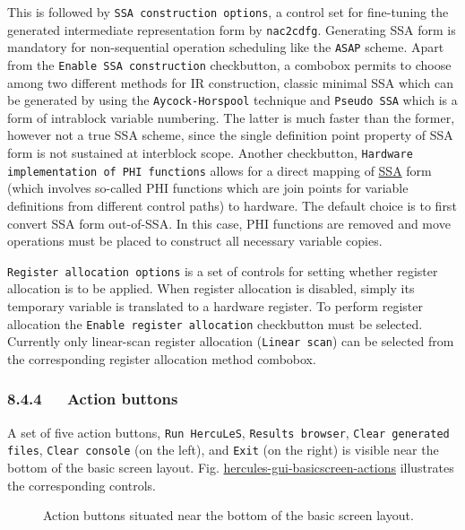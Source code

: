\documentclass[a4paper]{article}
\begin{document}
This is followed by \texttt{SSA construction options}, a control set for fine-tuning the generated intermediate representation form by \texttt{nac2cdfg}. Generating SSA form is mandatory for non-sequential operation scheduling like the \texttt{ASAP} scheme. Apart from the \texttt{Enable SSA construction} checkbutton, a combobox permits to choose among two different methods for IR construction, classic minimal SSA which can be generated by using the \texttt{Aycock-Horspool} technique and \texttt{Pseudo SSA} which is a form of intrablock variable numbering. The latter is much faster than the former, however not a true SSA scheme, since the single definition point property of SSA form is not sustained at interblock scope. Another checkbutton, \texttt{Hardware implementation of PHI functions} allows for a direct mapping of \href{http://en.wikipedia.org/wiki/Static_single_assignment_form}{SSA} form (which involves so-called PHI functions which are join points for variable definitions from different control paths) to hardware. The default choice is to first convert SSA form out-of-SSA. In this case, PHI functions are removed and move operations must be placed to construct all necessary variable copies.

\texttt{Register allocation options} is a set of controls for setting whether register allocation is to be applied. When register allocation is disabled, simply its temporary variable is translated to a hardware register. To perform register allocation the \texttt{Enable register allocation} checkbutton must be selected. Currently only linear-scan register allocation (\texttt{Linear scan}) can be selected from the corresponding register allocation method combobox.


\subsubsection{8.4.4~~~Action buttons%
  \label{action-buttons}%
}

A set of five action buttons, \texttt{Run HercuLeS}, \texttt{Results browser}, \texttt{Clear generated files}, \texttt{Clear console} (on the left), and \texttt{Exit} (on the right) is visible near the bottom of the basic screen layout. Fig. \hyperref[hercules-gui-basicscreen-actions]{hercules-gui-basicscreen-actions} illustrates the corresponding controls.
\begin{figure}
\label{hercules-gui-basicscreen-actions}
\noindent{}
\caption{Action buttons situated near the bottom of the basic screen layout.}
\end{figure}
\end{document}
